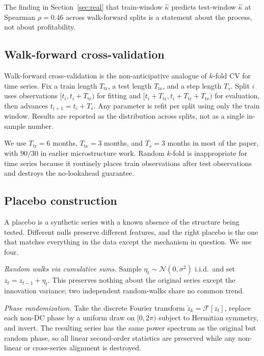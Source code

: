 \documentclass[11pt]{article}
\begin{document}
The finding in Section~\ref{sec:real} that train-window $\hat\kappa$ predicts test-window
$\hat\kappa$ at Spearman $\rho = 0.46$ across walk-forward splits is a statement about the
process, not about profitability.

\subsection{Walk-forward cross-validation}
\label{app:wf}

Walk-forward cross-validation is the non-anticipative analogue of $k$-fold CV for time
series. Fix a train length $T_{\mathrm{tr}}$, a test length $T_{\mathrm{te}}$, and a step
length $T_s$. Split $i$ uses observations $[t_i, t_i + T_{\mathrm{tr}})$ for fitting and
$[t_i + T_{\mathrm{tr}}, t_i + T_{\mathrm{tr}} + T_{\mathrm{te}})$ for evaluation, then
advances $t_{i+1} = t_i + T_s$. Any parameter is refit per split using only the train
window. Results are reported as the distribution across splits, not as a single in-sample
number.

We use $T_{\mathrm{tr}} = 6$ months, $T_{\mathrm{te}} = 3$ months, and $T_s = 3$ months in
most of the paper, with $90/30$ in earlier microstructure work. Random $k$-fold is
inappropriate for time series because it routinely places train observations after test
observations and destroys the no-lookahead guarantee.

\subsection{Placebo construction}
\label{app:placebo}

A placebo is a synthetic series with a known absence of the structure being tested.
Different nulls preserve different features, and the right placebo is the one that matches
everything in the data except the mechanism in question. We use four.

\emph{Random walks via cumulative sums.} Sample $\eta_t \sim \mathcal{N}(0, \sigma^2)$
i.i.d.~and set $z_t = z_{t-1} + \eta_t$. This preserves nothing about the original series
except the innovation variance; two independent random-walks share no common trend.

\emph{Phase randomization.} Take the discrete Fourier transform $\tilde{z}_k =
\mathcal{F}[z_t]$, replace each non-DC phase by a uniform draw on $[0, 2\pi)$ subject to
Hermitian symmetry, and invert. The resulting series has the same power spectrum as the
original but random phase, so all linear second-order statistics are preserved while any
non-linear or cross-series alignment is destroyed.
\end{document}

